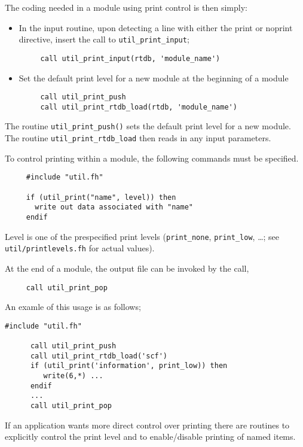 \sloppy
The coding needed in a module using print control is then simply:
\begin{itemize}
\item In the input routine, upon detecting a line with either the print
  or noprint directive, insert the call to {\tt util\_print\_input};
\begin{verbatim}
     call util_print_input(rtdb, 'module_name')
\end{verbatim}
\item Set the default print level for a new module at the beginning of a module
\begin{verbatim}
     call util_print_push 
     call util_print_rtdb_load(rtdb, 'module_name')
\end{verbatim}
\end{itemize}

The routine \verb+util_print_push()+ sets the default print level for a new
  module. The routine \verb+util_print_rtdb_load+  then
 reads in any input parameters.

To control printing within a module, the following commands must be specified.

\begin{verbatim}
     #include "util.fh"

     if (util_print("name", level)) then
       write out data associated with "name"
     endif
\end{verbatim}


Level is one of the prespecified print levels (\verb+print_none+,
  \verb+print_low+, \ldots; see \verb+util/printlevels.fh+ for
  actual values).

At the end of a module, the output file can be invoked by the call,
\begin{verbatim}
     call util_print_pop
\end{verbatim}

\fussy

 An examle of this usage is as follows;
\begin{verbatim}
#include "util.fh"

      call util_print_push
      call util_print_rtdb_load('scf')
      if (util_print('information', print_low)) then
         write(6,*) ...
      endif
      ...
      call util_print_pop
\end{verbatim}

 If an application wants more direct control over printing there are
routines to explicitly control the print level and to enable/disable
printing of named items.

